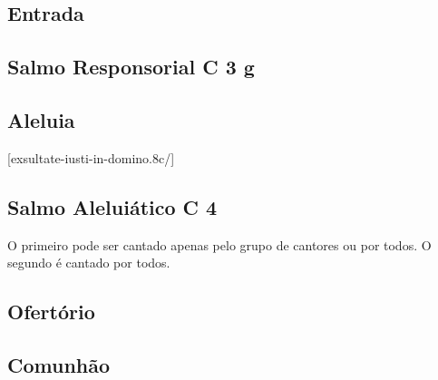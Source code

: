 
\subsection{Entrada}\label{subsection:proprium-sanctorum/omnium-sanctorum/introitus}

\subsection[Salmo Responsorial]{Salmo Responsorial \textmd{C 3 g}}\label{subsection:proprium-sanctorum/omnium-sanctorum/psalmus-responsorius}

\AllowPageFlush

\subsection{Aleluia}\label{subsection:proprium-sanctorum/omnium-sanctorum/alleluia}
[exsultate-iusti-in-domino.8c/]

\subsection[Salmo Aleluiático]{Salmo Aleluiático \textmd{C 4}}\label{subsection:proprium-sanctorum/omnium-sanctorum/psalmus-alleluiaticus}
\begin{rubrica}
  O primeiro {\normalfont\Rbar} pode ser cantado apenas pelo grupo de cantores ou por todos. O segundo {\normalfont\Rbar} é cantado por todos.
\end{rubrica}

\AllowPageFlush

\subsection{Ofertório}\label{subsection:proprium-sanctorum/omnium-sanctorum/offertorium}

\AllowPageFlush

\subsection{Comunhão}\label{subsection:proprium-sanctorum/omnium-sanctorum/communio}
